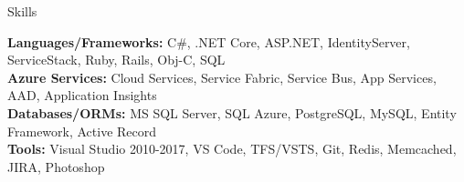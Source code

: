 \documentclass{resume} %
\begin{document}

\begin{rSection}{Skills}

\textbf{Languages/Frameworks:} C\#, .NET Core, ASP.NET, IdentityServer, ServiceStack, Ruby, Rails, Obj-C, SQL  \\
\textbf{Azure Services:} Cloud Services, Service Fabric, Service Bus, App Services, AAD, Application Insights \\
\textbf{Databases/ORMs:} MS SQL Server, SQL Azure, PostgreSQL, MySQL, Entity Framework, Active Record  \\
\textbf{Tools:} Visual Studio 2010-2017, VS Code, TFS/VSTS, Git, Redis, Memcached, JIRA, Photoshop  \\

\end{rSection}

\end{document}
